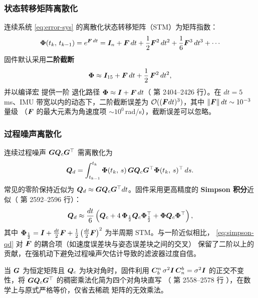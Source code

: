 \subsubsection{状态转移矩阵离散化}

连续系统 \cref{eq:error-sys} 的离散化状态转移矩阵（STM）为矩阵指数：
\begin{equation}
  \bm{\Phi}(t_k,\,t_{k-1}) = e^{\m{F}\,dt}
  = \m{I}_n + \m{F}\,dt + \frac{1}{2}\m{F}^2\,dt^2 + \frac{1}{6}\m{F}^3\,dt^3 + \cdots
  \label{eq:matrix-exp}
\end{equation}
固件默认采用\textbf{二阶截断}
\begin{equation}
  \bm{\Phi} \approx \boldsymbol{I}_{15} + \boldsymbol{F}\,dt + \frac{1}{2}\,\boldsymbol{F}^2\,dt^2,
  \label{eq:phi-second}
\end{equation}
并以编译宏  提供一阶
退化路径 $\bm{\Phi} \approx \boldsymbol{I} + \boldsymbol{F}\,dt$（ 第
2404--2426 行）。在 $dt = 5$\,ms、IMU 带宽以内的动态下，二阶截断误差为
$\mathcal{O}((\boldsymbol{F}dt)^3)$，其中 $\|\boldsymbol{F}\|\,dt \sim 10^{-3}$ 量级
（$\boldsymbol{F}$ 的最大元素为角速度项 $\sim 10^0$\,rad/s），截断误差可以忽略。

\subsubsection{过程噪声离散化}

连续过程噪声 $\boldsymbol{G}\boldsymbol{Q}_c\boldsymbol{G}^\top$ 需离散化为
\begin{equation}
  \boldsymbol{Q}_d = \int_{t_{k-1}}^{t_k} \bm{\Phi}(t_k,\,s)\,\boldsymbol{G}\boldsymbol{Q}_c\boldsymbol{G}^\top
  \bm{\Phi}(t_k,\,s)^{\top}\,ds.
  \label{eq:qd-def}
\end{equation}
常见的零阶保持近似为 $\boldsymbol{Q}_d \approx \boldsymbol{G}\boldsymbol{Q}_c\boldsymbol{G}^\top dt$。固件采用更高精度的
\textbf{Simpson 积分}近似（ 第 2592--2596 行）：
\begin{equation}
  \boldsymbol{Q}_d \approx \frac{dt}{6}\left(
    \boldsymbol{Q}_c + 4\,\bm{\Phi}_{\frac12}\boldsymbol{Q}_c\bm{\Phi}_{\frac12}^\top
    + \bm{\Phi}\boldsymbol{Q}_c\bm{\Phi}^\top
  \right),
  \label{eq:simpson-qd}
\end{equation}
其中 $\bm{\Phi}_{\frac12} = \boldsymbol{I} + \frac{dt}{2}\boldsymbol{F} +
\frac12\left(\frac{dt}{2}\boldsymbol{F}\right)^2$ 为半周期 STM。与一阶近似相比，
\cref{eq:simpson-qd} 对 $\boldsymbol{F}$ 的耦合项（如速度误差块与姿态误差块之间的交叉）
保留了二阶以上的贡献，在强机动下避免过程噪声欠估计导致的滤波器过度自信。

\begin{remark}
当 $\boldsymbol{G}$ 为恒定矩阵且 $\boldsymbol{Q}_c$ 为块对角时，固件利用
$\boldsymbol{C}_b^n\,\sigma^2\boldsymbol{I}\,\boldsymbol{C}_n^b = \sigma^2\boldsymbol{I}$ 的正交不变性，将
$\boldsymbol{G}\boldsymbol{Q}_c\boldsymbol{G}^\top$ 的稠密乘法化简为四个对角块直写
（ 第 2558--2578 行
），在数学上与原式严格等价，仅省去稀疏
矩阵的无效乘法。
\end{remark}

